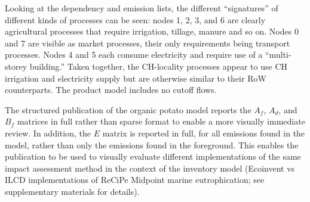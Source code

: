 Looking at the dependency and emission lists, the different ``signatures'' of different kinds of processes can be seen: nodes 1, 2, 3, and 6 are clearly agricultural processes that require irrigation, tillage, manure and so on.  Nodes 0 and 7 are visible as market processes, their only requirements being transport processes.  Nodes 4 and 5 each consume electricity and require use of a ``multi-storey building.''  Taken together, the CH-locality processes appear to use CH irrigation and electricity supply but are otherwise similar to their RoW counterparts.  The product model includes no cutoff flows.

The structured publication of the organic potato model reports the $A_f$, $A_d$, and $B_f$ matrices in full rather than sparse format to enable a more visually immediate review.  In addition, the $E$ matrix is reported in full, for all emissions found in the model, rather than only the emissions found in the foreground.  This enables the publication to be used to visually evaluate different implementations of the same impact assessment method in the context of the inventory model (Ecoinvent vs ILCD implementations of ReCiPe Midpoint marine eutrophication; see supplementary materials for details).
